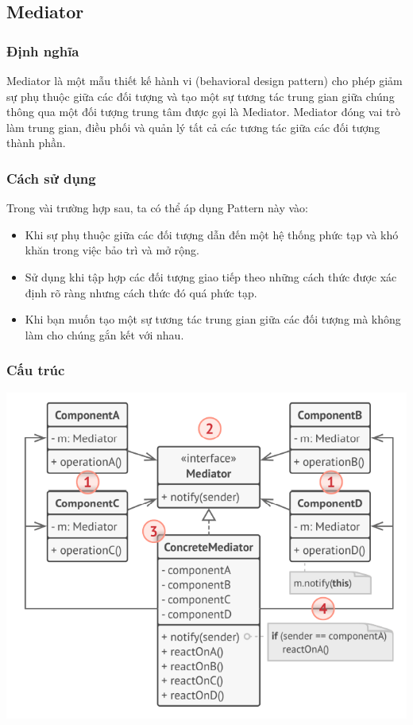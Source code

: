 \subsection{Mediator}
\subsubsection{Định nghĩa}
Mediator là một mẫu thiết kế hành vi (behavioral design pattern) cho phép giảm sự phụ thuộc giữa các đối tượng và tạo một sự tương tác trung gian giữa chúng thông qua một đối tượng trung tâm được gọi là Mediator. Mediator đóng vai trò làm trung gian, điều phối và quản lý tất cả các tương tác giữa các đối tượng thành phần.
\subsubsection{Cách sử dụng}
Trong vài trường hợp sau, ta có thể áp dụng Pattern này vào:
\begin{itemize}
    \item Khi sự phụ thuộc giữa các đối tượng dẫn đến một hệ thống phức tạp và khó khăn trong việc bảo trì và mở rộng.
    \item Sử dụng khi tập hợp các đối tượng giao tiếp theo những cách thức được xác định rõ ràng nhưng cách thức đó quá phức tạp.
    \item Khi bạn muốn tạo một sự tương tác trung gian giữa các đối tượng mà không làm cho chúng gắn kết với nhau.
\end{itemize}
\subsubsection{Cấu trúc}
\begin{center}
    \includegraphics[scale=0.6]{image/behavioral/mediator.png}
\end{center}
